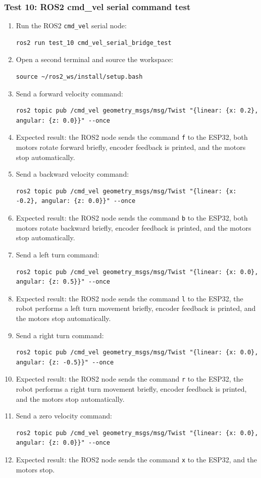 \documentclass[12pt]{article}
\begin{document}
\subsubsection{Test 10: ROS2 cmd\_vel serial command test}
\begin{enumerate}
    \item Run the ROS2 \texttt{cmd\_vel} serial node:
    \begin{verbatim}
ros2 run test_10 cmd_vel_serial_bridge_test
    \end{verbatim}
    \item Open a second terminal and source the workspace:
    \begin{verbatim}
source ~/ros2_ws/install/setup.bash
    \end{verbatim}
    \item Send a forward velocity command:
    \begin{verbatim}
ros2 topic pub /cmd_vel geometry_msgs/msg/Twist "{linear: {x: 0.2}, angular: {z: 0.0}}" --once
    \end{verbatim}
    \item Expected result: the ROS2 node sends the command \texttt{f} to the ESP32, both motors rotate forward briefly, encoder feedback is printed, and the motors stop automatically.
    \item Send a backward velocity command:
    \begin{verbatim}
ros2 topic pub /cmd_vel geometry_msgs/msg/Twist "{linear: {x: -0.2}, angular: {z: 0.0}}" --once
    \end{verbatim}
    \item Expected result: the ROS2 node sends the command \texttt{b} to the ESP32, both motors rotate backward briefly, encoder feedback is printed, and the motors stop automatically.
    \item Send a left turn command:
    \begin{verbatim}
ros2 topic pub /cmd_vel geometry_msgs/msg/Twist "{linear: {x: 0.0}, angular: {z: 0.5}}" --once
    \end{verbatim}
    \item Expected result: the ROS2 node sends the command \texttt{l} to the ESP32, the robot performs a left turn movement briefly, encoder feedback is printed, and the motors stop automatically.
    \item Send a right turn command:
    \begin{verbatim}
ros2 topic pub /cmd_vel geometry_msgs/msg/Twist "{linear: {x: 0.0}, angular: {z: -0.5}}" --once
    \end{verbatim}
    \item Expected result: the ROS2 node sends the command \texttt{r} to the ESP32, the robot performs a right turn movement briefly, encoder feedback is printed, and the motors stop automatically.
    \item Send a zero velocity command:
    \begin{verbatim}
ros2 topic pub /cmd_vel geometry_msgs/msg/Twist "{linear: {x: 0.0}, angular: {z: 0.0}}" --once
    \end{verbatim}
    \item Expected result: the ROS2 node sends the command \texttt{x} to the ESP32, and the motors stop.
\end{enumerate}
\end{document}
